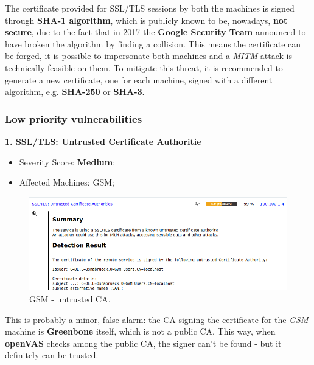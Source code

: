The certificate provided for SSL/TLS sessions by both the machines is signed through \textbf{SHA-1 algorithm}, which is publicly known to be, nowadays, \textbf{not secure}, due to the fact that in 2017 the \textbf{Google Security Team} announced to have broken the algorithm by finding a collision. This means the certificate can be forged, it is possible to impersonate both machines and a \textit{MITM} attack is technically feasible on them. To mitigate this threat, it is recommended to generate a new certificate, one for each machine, signed with a different algorithm, e.g. \textbf{SHA-250} or \textbf{SHA-3}.

\subsubsection{Low priority vulnerabilities}

\textbf{1. SSL/TLS: Untrusted Certificate Authoritie}
\begin{itemize}
\item Severity Score: \textbf{Medium};
\item Affected Machines: GSM;
\end{itemize}
\begin{figure}[!htb]
\centering
\begin{minipage}{.5\textwidth}
  \centering
  \includegraphics[width=1\textwidth]{certificateUntrustedAuthorityTLSGSM.png}
  \caption[a]{GSM - untrusted CA.}\label{fig:14}
\end{minipage}%
\end{figure}
This is probably a minor, false alarm: the CA signing the certificate for the \textit{GSM} machine is \textbf{Greenbone} itself, which is not a public CA. This way, when \textbf{openVAS} checks among the public CA, the signer can't be found - but it definitely can be trusted.\\

